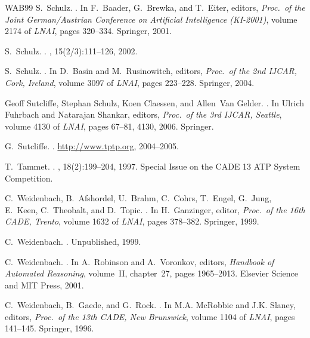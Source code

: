 \documentclass{article}
\begin{document}
\begin{thebibliography}{WAB{\etalchar{+}}99}
S.~Schulz.
.
\newblock In F.~Baader, G.~Brewka, and T.~Eiter, editors, {\em Proc.\ of the
  Joint German/Austrian Conference on Artificial Intelligence (KI-2001)},
  volume 2174 of {\em LNAI}, pages 320--334. Springer, 2001.

S.~Schulz.
.
, 15(2/3):111--126, 2002.

S.~Schulz.
.
\newblock In D.~Basin and M.~Rusinowitch, editors, {\em Proc.\ of the 2nd
  IJCAR, Cork, Ireland}, volume 3097 of {\em LNAI}, pages 223--228. Springer,
  2004.

Geoff Sutcliffe, Stephan Schulz, Koen Claessen, and Allen~Van Gelder.
.
\newblock In Ulrich Fuhrbach and Natarajan Shankar, editors, {\em Proc.\ of the
  3rd IJCAR, Seattle}, volume 4130 of {\em LNAI}, pages 67--81, 4130, 2006.
  Springer.

G.~Sutcliffe.
.
\newblock \url{http://www.tptp.org}, 2004--2005.

T.~Tammet.
.
, 18(2):199--204, 1997.
\newblock Special Issue on the CADE 13 ATP System Competition.

C.~Weidenbach, B.~Afshordel, U.~Brahm, C.~Cohrs, T.~Engel, G.~Jung, E.~Keen,
  C.~Theobalt, and D.~Topic.
.
\newblock In H.~Ganzinger, editor, {\em Proc.\ of the 16th CADE, Trento},
  volume 1632 of {\em LNAI}, pages 378--382. Springer, 1999.

C.~Weidenbach.
.
\newblock Unpublished, 1999.

C.~Weidenbach.
.
\newblock In A.~Robinson and A.~Voronkov, editors, {\em Handbook of Automated
  Reasoning}, volume~II, chapter~27, pages 1965--2013. Elsevier Science and MIT
  Press, 2001.

C.~Weidenbach, B.~Gaede, and G.~Rock.
.
\newblock In M.A. McRobbie and J.K. Slaney, editors, {\em Proc.\ of the 13th
  CADE, New Brunswick}, volume 1104 of {\em LNAI}, pages 141--145. Springer,
  1996.

\end{thebibliography}

\printindex
\end{document}
